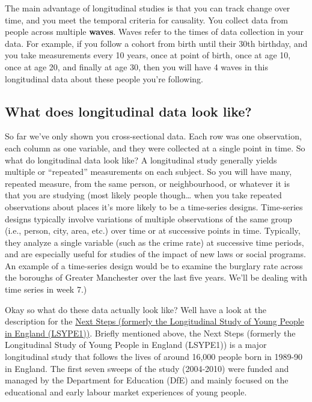 \documentclass[]{book}
\theoremstyle{definition}
\theoremstyle{definition}
\theoremstyle{definition}
\theoremstyle{remark}
\begin{document}
The main advantage of longitudinal studies is that you can track change
over time, and you meet the temporal criteria for causality. You collect
data from people across multiple \textbf{waves}. Waves refer to the
times of data collection in your data. For example, if you follow a
cohort from birth until their 30th birthday, and you take measurements
every 10 years, once at point of birth, once at age 10, once at age 20,
and finally at age 30, then you will have 4 waves in this longitudinal
data about these people you're following.

\hypertarget{what-does-longitudinal-data-look-like}{%
\subsection{What does longitudinal data look
like?}\label{what-does-longitudinal-data-look-like}}

So far we've only shown you cross-sectional data. Each row was one
observation, each column as one variable, and they were collected at a
single point in time. So what do longitudinal data look like? A
longitudinal study generally yields multiple or ``repeated''
measurements on each subject. So you will have many, repeated measure,
from the same person, or neighbourhood, or whatever it is that you are
studying (most likely people though\ldots{} when you take repeated
observations about places it's more likely to be a time-series designs.
Time-series designs typically involve variations of multiple
observations of the same group (i.e., person, city, area, etc.) over
time or at successive points in time. Typically, they analyze a single
variable (such as the crime rate) at successive time periods, and are
especially useful for studies of the impact of new laws or social
programs. An example of a time-series design would be to examine the
burglary rate across the boroughs of Greater Manchester over the last
five years. We'll be dealing with time series in week 7.)

Okay so what do these data actually look like? Well have a look at the
description for the
\href{https://discover.ukdataservice.ac.uk/series/?sn=2000030}{Next
Steps (formerly the Longitudinal Study of Young People in England
(LSYPE1))}. Briefly mentioned above, the Next Steps (formerly the
Longitudinal Study of Young People in England (LSYPE1)) is a major
longitudinal study that follows the lives of around 16,000 people born
in 1989-90 in England. The first seven sweeps of the study (2004-2010)
were funded and managed by the Department for Education (DfE) and mainly
focused on the educational and early labour market experiences of young
people.
\end{document}
